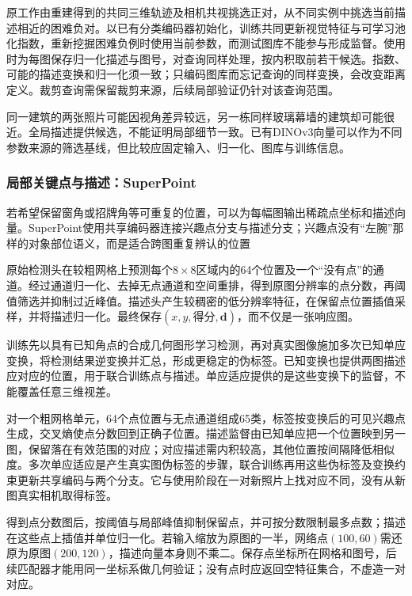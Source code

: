 原工作由重建得到的共同三维轨迹及相机共视挑选正对，从不同实例中挑选当前描述相近的困难负对。以已有分类编码器初始化，训练共同更新视觉特征与可学习池化指数，重新挖掘困难负例时使用当前参数，而测试图库不能参与形成监督。使用时为每图保存归一化描述与图号，对查询同样处理，按内积取前若干候选。指数、可能的描述变换和归一化须一致；只编码图库而忘记查询的同样变换，会改变距离定义。裁剪查询需保留裁剪来源，后续局部验证仍针对该查询范围。

同一建筑的两张照片可能因视角差异较远，另一栋同样玻璃幕墙的建筑却可能很近。全局描述提供候选，不能证明局部细节一致。已有DINOv3向量可以作为不同参数来源的筛选基线，但比较应固定输入、归一化、图库与训练信息。

\Needspace{55mm}
\subsubsection{局部关键点与描述：SuperPoint}
\label{sec:vision-recognition-superpoint}

若希望保留窗角或招牌角等可重复的位置，可以为每幅图输出稀疏点坐标和描述向量。SuperPoint使用共享编码器连接兴趣点分支与描述分支；兴趣点没有“左腕”那样的对象部位语义，而是适合跨图重复辨认的位置

原始检测头在较粗网格上预测每个$8\times8$区域内的64个位置及一个“没有点”的通道。经过通道归一化、去掉无点通道和空间重排，得到原图分辨率的点分数，再阈值筛选并抑制过近峰值。描述头产生较稠密的低分辨率特征，在保留点位置插值采样，并将描述归一化。最终保存$(x,y,\text{得分},\bm{d})$，而不仅是一张响应图。

训练先以具有已知角点的合成几何图形学习检测，再对真实图像施加多次已知单应变换，将检测结果逆变换并汇总，形成更稳定的伪标签。已知变换也提供两图描述应对应的位置，用于联合训练点与描述。单应适应提供的是这些变换下的监督，不能覆盖任意三维视差。

对一个粗网格单元，64个点位置与无点通道组成65类，标签按变换后的可见兴趣点生成，交叉熵使点分数回到正确子位置。描述监督由已知单应把一个位置映到另一图，保留落在有效范围的对应；对应描述需内积较高，其他位置按间隔降低相似度。多次单应适应是产生真实图伪标签的步骤，联合训练再用这些伪标签及变换约束更新共享编码与两个分支。它与使用阶段在一对新照片上找对应不同，没有从新图真实相机取得标签。

得到点分数图后，按阈值与局部峰值抑制保留点，并可按分数限制最多点数；描述在这些点上插值并单位归一化。若输入缩放为原图的一半，网络点$(100,60)$需还原为原图$(200,120)$，描述向量本身则不乘二。保存点坐标所在网格和图号，后续匹配器才能用同一坐标系做几何验证；没有点时应返回空特征集合，不虚造一对对应。

